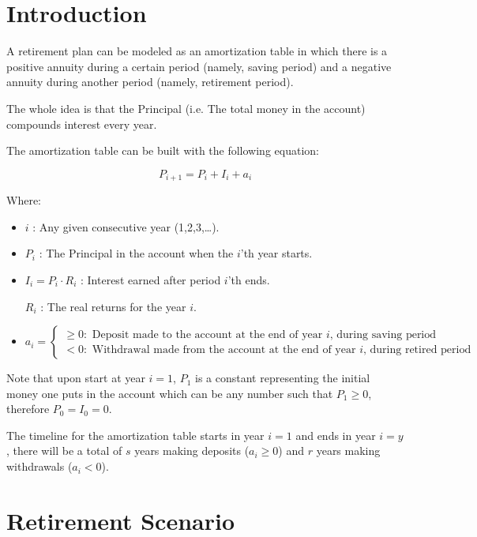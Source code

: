 \documentclass[10pt]{article}
\begin{document}
\section{Introduction}


A retirement plan can be modeled as an amortization table in which there is a positive annuity during a certain period (namely, saving period) and a negative annuity during another period (namely, retirement period).


The whole idea is that the Principal (i.e. The total money in the account) compounds interest every year.


The amortization table can be built with the following equation:

\[P_{i+1} = P_i + I_i + a_i\]

Where:
\begin{itemize}
\item $i$ : Any given consecutive year (1,2,3,\ldots).
\item $P_i$ : The Principal in the account when the $i$'th year starts.
\item $I_i = P_i \cdot R_i$ : Interest earned after period $i$'th ends.

$R_i$ : The real returns for the year $i$.
\item $a_i =
\begin{cases}
\geq 0: \text{ Deposit made to the account at the end of year $i$, during saving period} \\
< 0: \text{ Withdrawal made from the account at the end of year $i$, during retired period}
\end{cases} $

\end{itemize}

Note that upon start at year $i=1$, $P_1$ is a constant representing the initial money one puts in the account which can be any number such that $P_1\geq 0$, therefore $P_0=I_0=0$.

The timeline for the amortization table starts in year $i=1$ and ends in year $i=y$, there will be a total of $s$ years making deposits ($a_i \geq 0$) and $r$ years making withdrawals ($a_i < 0$).

\section{Retirement Scenario}
\end{document}
